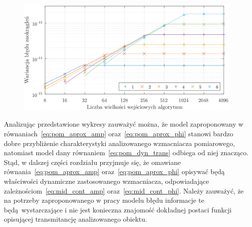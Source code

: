 \begin{figure}[htb!]
\begin{center}
\includegraphics{obrazki/dwt_rerror_coif5}
\end{center}
\end{figure}

Analizując przedstawione wykresy zauważyć można, że model zaproponowany w równaniach~\eqref{eq:pom_aprox_amp} oraz~\eqref{eq:pom_aprox_phi} stanowi bardzo dobre przybliżenie charakterystyki analizowanego wzmacniacza pomiarowego, natomiast model dany równaniem~\eqref{eq:pom_dyn_trans} odbiega od niej znacząco. Stąd, w dalszej części rozdziału przyjmuje się, że omawiane równania~\eqref{eq:pom_aprox_amp} oraz~\eqref{eq:pom_aprox_phi} opisywać będą właściwości dynamiczne zastosowanego wzmacniacza, odpowiadające zależnościom~\eqref{eq:mid_cont_amp} oraz~\eqref{eq:mid_cont_phi}. Należy zauważyć, że na potrzeby zaproponowanego w pracy modelu błędu informacje te będą wystarczające i nie jest konieczna znajomość dokładnej postaci funkcji opisującej transmitancję analizowanego obiektu.

